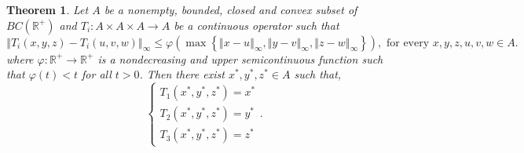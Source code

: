 \documentclass{amsart}
\newtheorem{theorem}{Theorem}
\theoremstyle{plain}
\numberwithin{equation}{section}
\begin{document}
\begin{theorem}
\label{main}Let $A$ be a nonempty, bounded, closed and convex subset of $BC\left( \mathbb{R}^{+}\right) $ and $T_{i}:A\times A\times A\rightarrow A$
be a continuous operator such that\begin{equation}
\left\Vert T_{i}\left( x,y,z\right) -T_{i}\left( u,v,w\right) \right\Vert
_{\infty }\leqslant \varphi \left( \max \left\{ \left\Vert x-u\right\Vert
_{\infty },\left\Vert y-v\right\Vert _{\infty },\left\Vert z-w\right\Vert
_{\infty }\right\} \right) ,\text{ for every }x,y,z,u,v,w\in A.
\label{cndtn}
\end{equation}where $\varphi :\mathbb{R}^{+}\rightarrow \mathbb{R}^{+}$ is a nondecreasing
and upper semicontinuous function such that $\varphi \left( t\right) <t$ for
all $t>0$. Then there exist $x^{\ast },y^{\ast },z^{\ast }\in A$ such that,\begin{equation*}
\left\{ 
\begin{array}{c}
T_{1}\left( x^{\ast },y^{\ast },z^{\ast }\right) =x^{\ast } \\ 
T_{2}\left( x^{\ast },y^{\ast },z^{\ast }\right) =y^{\ast } \\ 
T_{3}\left( x^{\ast },y^{\ast },z^{\ast }\right) =z^{\ast }\end{array}\right. .
\end{equation*}
\end{theorem}
\end{document}
